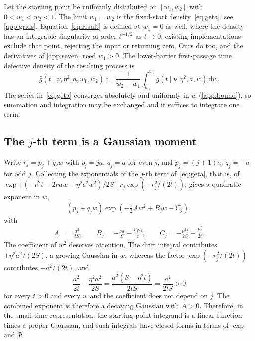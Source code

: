\documentclass[final,5p,times,twocolumn,authoryear]{elsarticle}
\newcommand{\dd}{\,\mathrm{d}}
\newcommand{\gbar}{\bar{g}}
\begin{document}
Let the starting point be uniformly distributed on $[w_1, w_2]$ with $0 < w_1 < w_2 < 1$. The limit $w_1 = w_2$ is the fixed-start density~\eqref{eq:geta}, see \ref{app:grids}. Equation~\eqref{eq:result} is defined at $w_1 = 0$ as well, where the density has an integrable singularity of order $t^{-1/2}$ as $t \to 0$; existing implementations exclude that point, rejecting the input or returning zero. Ours do too, and the derivatives of \ref{app:seven} need $w_1 > 0$. The lower-barrier first-passage time defective density of the resulting process is
\begin{equation}
\gbar\left(t \mid \nu, \eta^2, a, w_1, w_2\right) := \frac{1}{w_2 - w_1}\int_{w_1}^{w_2} g\left(t \mid \nu, \eta^2, a, w\right) \dd w .
\label{eq:def}
\end{equation}
The series in~\eqref{eq:geta} converges absolutely and uniformly in $w$ (\ref{app:bound}), so summation and integration may be exchanged and it suffices to integrate one term.

\subsection{The $j$-th term is a Gaussian moment}

Write $r_j = p_j + q_j w$ with $p_j = ja$, $q_j = a$ for even $j$, and $p_j = (j+1)a$, $q_j = -a$ for odd $j$. Collecting the exponentials of the $j$-th term of~\eqref{eq:geta}, that is, of $\exp[(-\nu^2 t - 2\nu a w + \eta^2 a^2 w^2)/2S]\, r_j \exp(-r_j^2/(2t))$, gives a quadratic exponent in $w$,
\begin{equation}
(p_j + q_j w)\exp\!\left(-\tfrac{1}{2} A w^2 + B_j w + C_j\right),
\label{eq:term}
\end{equation}
with
\begin{align}
A &= \frac{a^2}{tS}, \qquad
B_j = -\frac{\nu a}{S} - \frac{p_j q_j}{t}, \qquad
C_j = -\frac{\nu^2 t}{2S} - \frac{p_j^2}{2t}.
\label{eq:coef}
\end{align}
The coefficient of $w^2$ deserves attention. The drift integral contributes $+\eta^2 a^2/(2S)$, a growing Gaussian in $w$, whereas the factor $\exp(-r_j^2/(2t))$ contributes $-a^2/(2t)$, and
\begin{equation}
\frac{a^2}{2t} - \frac{\eta^2 a^2}{2S} = \frac{a^2 (S - \eta^2 t)}{2tS} = \frac{a^2}{2tS} > 0
\label{eq:key}
\end{equation}
for every $t > 0$ and every $\eta$, and the coefficient does not depend on $j$. The combined exponent is therefore a decaying Gaussian with $A > 0$. Therefore, in the small-time representation, the starting-point integrand is a linear function times a proper Gaussian, and such integrals have closed forms in terms of $\exp$ and $\Phi$.
\end{document}
